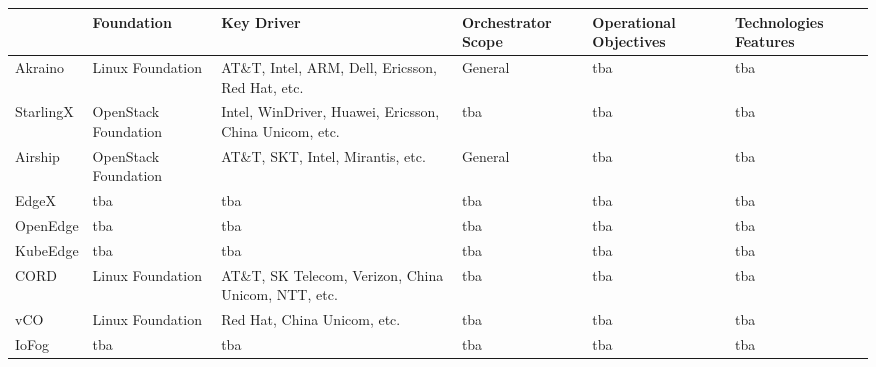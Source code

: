 \begin{turn}{90}
    \begin{tabular}{ | l | l | l | l | l | p{2cm} |}
    \hline
      & Foundation & Key Driver & Orchestrator Scope & Operational Objectives & Technologies Features\\ \hline
    Akraino & Linux Foundation & AT\&T, Intel, ARM, Dell, Ericsson, Red Hat, etc. & General & tba & tba \\ \hline

    StarlingX & OpenStack Foundation & Intel, WinDriver, Huawei, Ericsson, China Unicom, etc. & tba & tba & tba \\ \hline

    Airship & OpenStack Foundation &  AT\&T, SKT, Intel, Mirantis, etc. & General & tba & tba \\ \hline

    EdgeX & tba & tba & tba & tba & tba \\ \hline

    OpenEdge & tba & tba & tba & tba & tba \\ \hline

    KubeEdge & tba & tba & tba & tba & tba \\ \hline

    CORD & Linux Foundation & AT\&T, SK Telecom, Verizon, China Unicom, NTT, etc. & tba & tba & tba \\ \hline

    vCO & Linux Foundation & Red Hat, China Unicom, etc. & tba & tba & tba \\ \hline

    IoFog & tba & tba & tba & tba & tba \\ \hline
    
    \end{tabular}
\end{turn}
